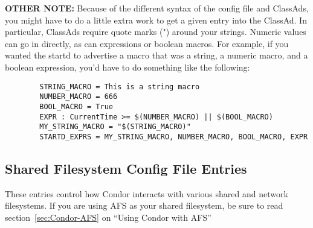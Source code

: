 \begin{description}
  \textbf{OTHER NOTE:} Because of the different syntax of the config
  file and ClassAds, you might have to do a little extra work to get a
  given entry into the ClassAd.  In particular, ClassAds require quote
  marks (") around your strings.  Numeric values can go in directly,
  as can expressions or boolean macros.  For example, if you wanted
  the startd to advertise a macro that was a string, a numeric macro,
  and a boolean expression, you'd have to do something like the
  following:

\begin{verbatim}
        STRING_MACRO = This is a string macro
        NUMBER_MACRO = 666
        BOOL_MACRO = True
        EXPR : CurrentTime >= $(NUMBER_MACRO) || $(BOOL_MACRO)
        MY_STRING_MACRO = "$(STRING_MACRO)"
        STARTD_EXPRS = MY_STRING_MACRO, NUMBER_MACRO, BOOL_MACRO, EXPR
\end{verbatim}

\end{description}

\subsection{Shared Filesystem Config File Entries}
\label{sec:Shared-Filesystem-Config-File-Entries}

These entries control how Condor interacts with various shared and
network filesystems.  If you are using AFS as your shared filesystem,
be sure to read section~\ref{sec:Condor-AFS} on ``Using Condor with
AFS''

